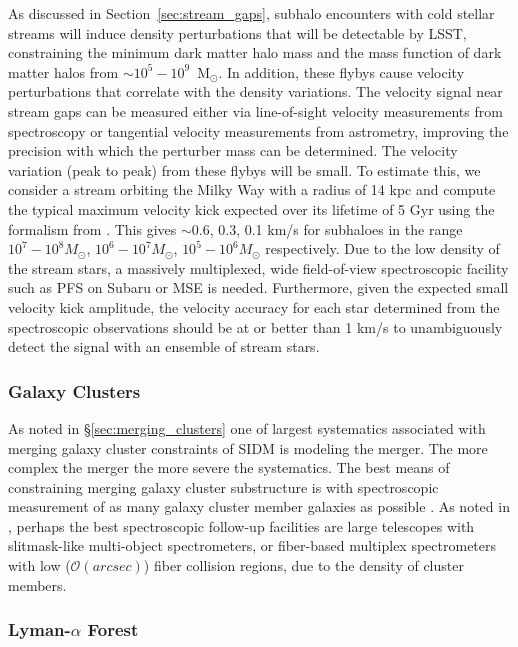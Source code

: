 As discussed in Section~\ref{sec:stream_gaps}, subhalo encounters with cold stellar streams will induce density perturbations that will be detectable by LSST, constraining the minimum dark matter halo mass and the mass function of dark matter halos from $\sim10^{5} - 10^{9}$~M$_{\odot}$. In addition, these flybys cause velocity perturbations that correlate with the density variations.  The velocity signal near stream gaps can be measured either via line-of-sight velocity measurements from spectroscopy or tangential velocity measurements from astrometry, improving the precision with which the perturber mass can be determined.
The velocity variation (peak to peak) from these flybys will be small. To estimate this, we consider a stream orbiting the Milky Way with a radius of 14 kpc and compute the typical maximum velocity kick expected over its lifetime of 5 Gyr using the formalism from \cite{erkal2016}.  This gives $\sim$0.6, 0.3, 0.1 km/s for subhaloes in the range $10^7-10^8 M_\odot$, $10^6-10^7 M_\odot$, $10^5 -10^6 M_\odot$ respectively. Due to the low density of the stream stars, a massively multiplexed, wide field-of-view spectroscopic facility such as PFS on Subaru or MSE is needed. Furthermore, given the expected small velocity kick amplitude, the velocity accuracy for each star determined from the spectroscopic observations should be at or better than 1 km/s to unambiguously detect the signal with an ensemble of stream stars.

\subsubsection{Galaxy Clusters }
As noted in \S\ref{sec:merging_clusters} one of largest systematics associated with merging galaxy cluster constraints of SIDM is modeling the merger. The more complex the merger the more severe the systematics.
The best means of constraining merging galaxy cluster substructure is with spectroscopic measurement of as many galaxy cluster member galaxies as possible \cite[see e.g.,][]{2018arXiv180610619G}.
As noted in \cite{2016arXiv161001661N}, perhaps the best spectroscopic follow-up facilities are large telescopes with slitmask-like multi-object spectrometers, or fiber-based multiplex spectrometers with low ($\mathcal{O}(arcsec)$) fiber collision regions, due to the density of cluster members.


\subsubsection{Lyman-$\alpha$ Forest }

